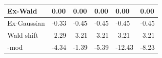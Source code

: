 \begin{tabular}{|l|l|l|l|l|l|}
\hline
Ex-Wald&0.00&0.00&0.00&0.00&0.00\\\hline
Ex-Gaussian&-0.33&-0.45&-0.45&-0.45&-0.45\\\hline
Wald shift&-2.29&-3.21&-3.21&-3.21&-3.21\\\hline
\rocdd{}-mod&-4.34&-1.39&-5.39&-12.43&-8.23\\\hline
\end{tabular}
